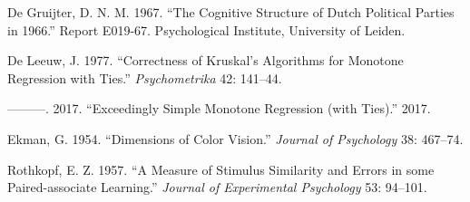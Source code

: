 \documentclass[
  12pt,
]{article}
\newlength{\cslhangindent}
\newenvironment{CSLReferences}[2] %
 {\begin{list}{}{%
  \setlength{\itemindent}{0pt}
  \setlength{\leftmargin}{0pt}
  \setlength{\parsep}{0pt}
  \ifodd #1
   \setlength{\leftmargin}{\cslhangindent}
   \setlength{\itemindent}{-1\cslhangindent}
  \fi
  \setlength{\itemsep}{#2\baselineskip}}}
 {\end{list}}
\begin{document}
\label{refs}
\begin{CSLReferences}{1}{0}
De Gruijter, D. N. M. 1967. {``{The Cognitive Structure of Dutch Political Parties in 1966}.''} Report E019-67. Psychological Institute, University of Leiden.

De Leeuw, J. 1977. {``Correctness of Kruskal's Algorithms for Monotone Regression with Ties.''} \emph{Psychometrika} 42: 141--44.

---------. 2017. {``{Exceedingly Simple Monotone Regression (with Ties)}.''} 2017.

Ekman, G. 1954. {``{Dimensions of Color Vision}.''} \emph{Journal of Psychology} 38: 467--74.

Rothkopf, E. Z. 1957. {``{A Measure of Stimulus Similarity and Errors in some Paired-associate Learning}.''} \emph{Journal of Experimental Psychology} 53: 94--101.

\end{CSLReferences}
\end{document}
